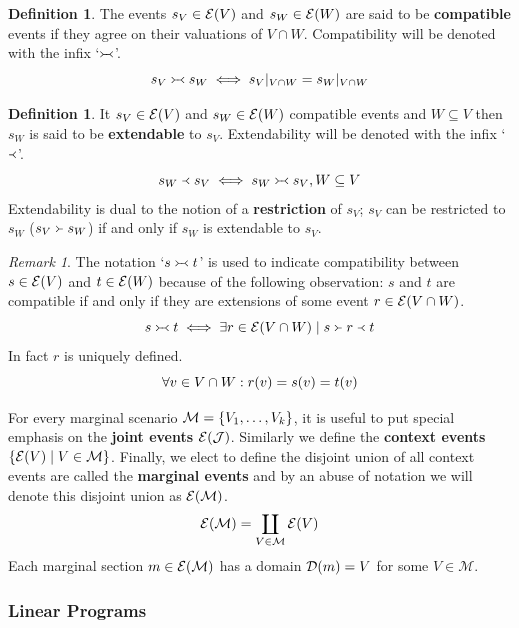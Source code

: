 \documentclass[aps, 10pt, english, twoside, pra, nofootinbib, longbibliography]{revtex4-1}
\theoremstyle{plain}
\theoremstyle{definition}
\newtheorem{definition}[theorem]{Definition}
\theoremstyle{remark}
\newtheorem{remark}[theorem]{Remark}
\newcommand{\com}{\mathrel{\Yright\hspace{-0.2em}\Yleft}}
\newcommand{\ext}{\mathrel{\Yleft}}
\newcommand{\res}{\mathrel{\Yright}}
\newcommand{\mscenario}{\mathcal{M}}
\newcommand{\jointvar}{\mathcal{J}}
\newcommand{\term}[1]{\textcolor{Mahogany}{\textbf{#1}}}
\newcommand{\Events}[1]{\s{E}\br{#1}} %
\newcommand{\Dom}[1]{\s{D}\br{#1}} %
\begin{document}
    \begin{definition}
    \label{def:section_compatible}
    The events $s_{V} \in \Events{V}$ and $s_{W} \in \Events{W}$ are said to be \term{compatible} events if they agree on their valuations of $V \cap W$. Compatibility will be denoted with the infix `$\com$'.
    \[ s_{V} \com s_{W} \iff {s_{V}}|_{V\cap W} = {s_{W}}|_{V\cap W} \]
    \end{definition}
    \begin{definition}
    \label{def:section_extendable}
    It $s_V \in \Events{V}$ and $s_W \in \Events{W}$ compatible events and $W \subseteq V$ then $s_W$ is said to be \term{extendable} to $s_V$. Extendability will be denoted with the infix `$\ext$'.
    \[ s_W \ext s_V \iff s_W \com s_V, W \subseteq V \]
    Extendability is dual to the notion of a \term{restriction} of $s_V$; $s_V$ can be restricted to $s_W$ ($s_V \res s_W$) if and only if $s_W$ is extendable to $s_V$.
    \end{definition}

    \begin{remark}
        The notation `$s \com t$' is used to indicate compatibility between $s \in \Events{V}$ and $t \in \Events{W}$ because of the following observation: $s$ and $t$ are compatible if and only if they are extensions of some event $r \in \Events{V \cap W}$.
        \[ s \com t \iff \exists r \in \Events{V \cap W} \mid s \res r \ext t \]
        In fact $r$ is uniquely defined.
        \[ \forall v \in V \cap W : r\br{v} = s\br{v} = t\br{v} \]
    \end{remark}

    For every marginal scenario $\mscenario = \bc{V_1, \ldots, V_k}$, it is useful to put special emphasis on the \term{joint events} $\Events{\jointvar}$. Similarly we define the \term{context events} $\bc{\Events{V} \mid V \in \mscenario}$. Finally, we elect to define the disjoint union of all context events are called the \term{marginal events} and by an abuse of notation we will denote this disjoint union as $\Events{\mscenario}$.
    \[ \Events{\mscenario} = \coprod_{V \in \mscenario} \Events{V} \]
    Each marginal section $m \in \Events{\mscenario}$ has a domain $\Dom{m} = V$ for some $V \in \mscenario$.
    \subsubsection{Linear Programs}
    \label{sec:linear_programs}
\end{document}
